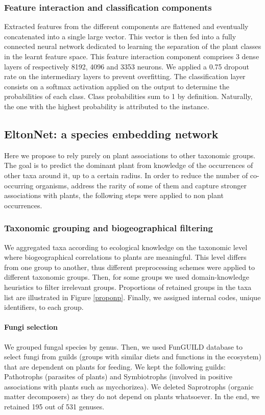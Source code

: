 \documentclass[]{article}
\begin{document}
\subsubsection{Feature interaction and classification components}
Extracted features from the different components are flattened and eventually concatenated into a single large vector. This vector is then fed into a fully connected neural network dedicated to learning the separation of the plant classes in the learnt feature space. This feature interaction component comprises 3 dense layers of respectively 8192, 4096 and 3353 neurons. We applied a 0.75 dropout rate on the intermediary layers to prevent overfitting. The classification layer consists on a softmax activation applied on the output to determine the probabilities of each class. Class probabilities sum to 1 by definition. Naturally, the one with the highest probability is attributed to the instance. 

\subsection{EltonNet: a species embedding network}
Here we propose to rely purely on plant associations to other taxonomic groups. The goal is to predict the dominant plant from knowledge of the occurrences of other taxa around it, up to a certain radius. In order to reduce the number of co-occurring organisms, address the rarity of some of them and capture stronger associations with plants, the following steps were applied to non plant occurrences. 

\subsubsection{Taxonomic grouping and biogeographical filtering}
We aggregated taxa according to ecological knowledge on the taxonomic level where biogeographical correlations to plants are meaningful. This level differs from one group to another, thus different preprocessing schemes were applied to different taxonomic groups. Then, for some groups we used domain-knowledge heuristics to filter irrelevant groups. Proportions of retained groups in the taxa list are illustrated in Figure \ref{proponp}. Finally, we assigned internal codes, unique identifiers, to each group. 

\paragraph{Fungi selection}
We grouped fungal species by genus. Then, we used FunGUILD database\cite{nguyen2016funguild} to select fungi from guilds (groups with similar diets and functions in the ecosystem) that are dependent on plants for feeding. We kept the following guilds: Pathotrophs (parasites of plants) and Symbiotrophs (involved in positive associations with plants such as mycchorizea). We deleted Saprotrophs (organic matter decomposers) as they do not depend on plants whatsoever. In the end, we retained 195 out of 531 genuses. 
\end{document}
